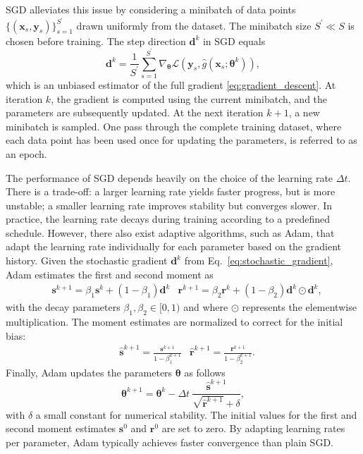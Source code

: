 \documentclass[a4paper, 11pt]{article}
\newcommand{\btheta}{\bm{\theta}}
\theoremstyle{plain} %
\begin{document}
	SGD alleviates this issue by considering a minibatch of data points $ \{(\bm{x}_{s}, \bm{y}_{s}) \}_{s=1}^{S^\prime} $ drawn uniformly from the dataset. The minibatch size $ S^\prime \ll S$ is chosen before training. The step direction $ \bm{d}^{k} $ in SGD equals
	\begin{equation}\label{eq:stochastic_gradient}
		\bm{d}^{k} = \frac{1}{S^\prime}\sum_{s=1}^{S^\prime} \nabla_{\btheta} \mathcal{L}\left(\bm{y}_{s}, \hat{g}(\bm{x}_{s};\btheta^{k}) \right),
	\end{equation}
	which is an unbiased estimator of the full gradient \eqref{eq:gradient_descent}. At iteration $ k $, the gradient is computed using the current minibatch, and the parameters are subsequently updated. At the next iteration $ k+1 $, a new minibatch is sampled. One pass through the complete training dataset, where each data point has been used once for updating the parameters, is referred to as an epoch.

	The performance of SGD depends heavily on the choice of the learning rate $ \Delta t $. There is a trade-off: a larger learning rate yields faster progress, but is more unstable; a smaller learning rate improves stability but converges slower. In practice, the learning rate decays during training according to a predefined schedule. However, there also exist adaptive algorithms, such as Adam, that adapt the learning rate individually for each parameter based on the gradient history. Given the stochastic gradient $ \bm{d}^{k} $ from Eq.~\eqref{eq:stochastic_gradient}, Adam estimates the first and second moment as
	\begin{align}\label{eq:adam_moments}
		&\bm{s}^{k+1} = \beta_1 \bm{s}^k + (1 - \beta_1)\bm{d}^{k}
		&\bm{r}^{k+1} = \beta_2 \bm{r}^k + (1 - \beta_2)\bm{d}^{k} \odot \bm{d}^{k},
	\end{align}
	with the decay parameters $ \beta_1, \beta_2 \in [0,1)$ and where $ \odot $ represents the elementwise multiplication. The moment estimates are normalized to correct for the initial bias:
	\begin{align}\label{eq:adam_moments_normal}
		&\hat{\bm{s}}^{k+1} = \frac{\bm{s}^{k+1}}{1 - \beta_{1}^{k+1}}
		&\hat{\bm{r}}^{k+1} = \frac{\bm{r}^{k+1}}{1 - \beta_{2}^{k+1}}.
	\end{align}
	Finally, Adam updates the parameters $ \btheta $ as follows
	\begin{equation}
		\btheta^{k+1} = \btheta^{k} -\Delta t~\frac{\hat{\bm{s}}^{k+1}}{\sqrt{\hat{\bm{r}}^{k+1}}+\delta},
	\end{equation}
	with $ \delta $ a small constant for numerical stability. The initial values for the first and second moment estimates $ \bm{s}^{0} $ and $ \bm{r}^{0} $ are set to zero. By adapting learning rates per parameter, Adam typically achieves faster convergence than plain SGD. 
	
\end{document}
